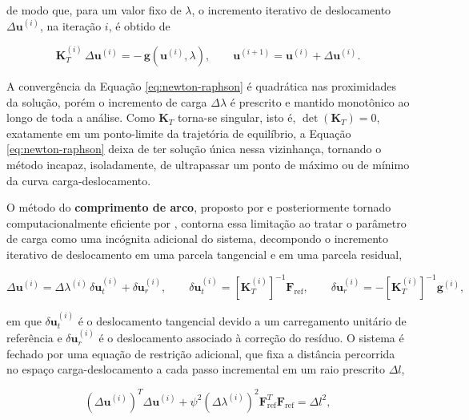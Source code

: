 de modo que, para um valor fixo de $\lambda$, o incremento
iterativo de deslocamento $\Delta\mathbf{u}^{(i)}$, na iteração
$i$, é obtido de

\begin{equation}
  \mathbf{K}_T^{(i)}\, \Delta\mathbf{u}^{(i)} =
  -\,\mathbf{g}\!\left(\mathbf{u}^{(i)}, \lambda\right),
  \qquad
  \mathbf{u}^{(i+1)} = \mathbf{u}^{(i)} + \Delta\mathbf{u}^{(i)}.
  \label{eq:newton-raphson}
\end{equation}

A convergência da Equação \ref{eq:newton-raphson} é quadrática nas
proximidades da solução, porém o incremento de carga $\Delta\lambda$
é prescrito e mantido monotônico ao longo de toda a análise. Como
$\mathbf{K}_T$ torna-se singular, isto é,
$\det(\mathbf{K}_T) = 0$, exatamente em um ponto-limite da
trajetória de equilíbrio, a Equação \ref{eq:newton-raphson} deixa
de ter solução única nessa vizinhança, tornando o método incapaz,
isoladamente, de ultrapassar um ponto de máximo ou de mínimo da
curva carga-deslocamento.

O método do \textbf{comprimento de arco}, proposto por
\citealp{riks1979} e posteriormente tornado computacionalmente
eficiente por \citealp{crisfield1981}, contorna essa limitação ao
tratar o parâmetro de carga como uma incógnita adicional do
sistema, decompondo o incremento iterativo de deslocamento em uma
parcela tangencial e em uma parcela residual,

\begin{equation}
  \Delta\mathbf{u}^{(i)} = \Delta\lambda^{(i)}\,
  \delta\mathbf{u}_t^{(i)} + \delta\mathbf{u}_r^{(i)},
  \qquad
  \delta\mathbf{u}_t^{(i)} =
  \left[\mathbf{K}_T^{(i)}\right]^{-1} \mathbf{F}_{\text{ref}},
  \qquad
  \delta\mathbf{u}_r^{(i)} =
  -\left[\mathbf{K}_T^{(i)}\right]^{-1}
  \mathbf{g}^{(i)},
  \label{eq:arco-decomposicao}
\end{equation}

em que $\delta\mathbf{u}_t^{(i)}$ é o deslocamento tangencial
devido a um carregamento unitário de referência e
$\delta\mathbf{u}_r^{(i)}$ é o deslocamento associado à correção do
resíduo. O sistema é fechado por uma equação de restrição
adicional, que fixa a distância percorrida no espaço
carga-deslocamento a cada passo incremental em um raio prescrito
$\Delta l$,

\begin{equation}
  \left(\Delta\mathbf{u}^{(i)}\right)^{\!T} \Delta\mathbf{u}^{(i)}
  + \psi^2 \left(\Delta\lambda^{(i)}\right)^{\!2}
  \mathbf{F}_{\text{ref}}^{T} \mathbf{F}_{\text{ref}} = \Delta l^2,
  \label{eq:arco-restricao}
\end{equation}

